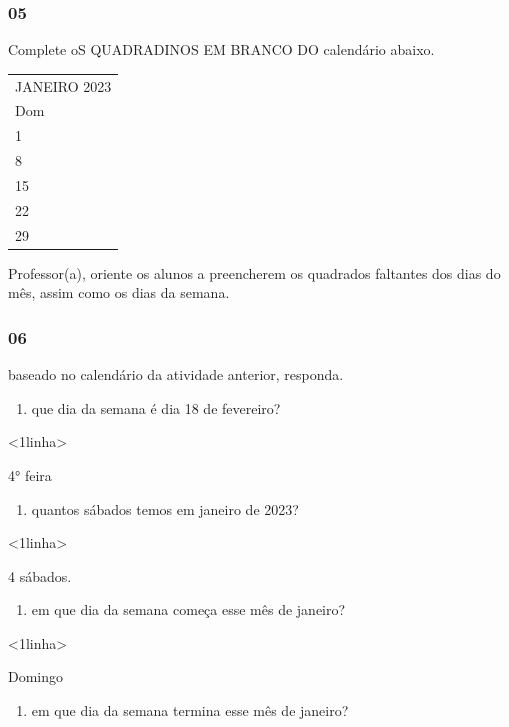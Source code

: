 \subsubsection{05}\label{section-43}

Complete oS QUADRADINOS EM BRANCO DO calendário abaixo.

\begin{longtable}[]{@{}l@{}}
\toprule
JANEIRO 2023\tabularnewline
Dom\tabularnewline
1\tabularnewline
8\tabularnewline
15\tabularnewline
22\tabularnewline
29\tabularnewline
\bottomrule
\end{longtable}

Professor(a), oriente os alunos a preencherem os quadrados faltantes dos
dias do mês, assim como os dias da semana.

\subsubsection{06}\label{section-44}

baseado no calendário da atividade anterior, responda.

\begin{enumerate}
\def\labelenumi{\Alph{enumi})}
\item
  que dia da semana é dia 18 de fevereiro?
\end{enumerate}

\textless{}1linha\textgreater{}

4° feira

\begin{enumerate}
\def\labelenumi{\Alph{enumi})}
\item
  quantos sábados temos em janeiro de 2023?
\end{enumerate}

\textless{}1linha\textgreater{}

4 sábados.

\begin{enumerate}
\def\labelenumi{\Alph{enumi})}
\item
  em que dia da semana começa esse mês de janeiro?
\end{enumerate}

\textless{}1linha\textgreater{}

Domingo

\begin{enumerate}
\def\labelenumi{\Alph{enumi})}
\item
  em que dia da semana termina esse mês de janeiro?
\end{enumerate}

